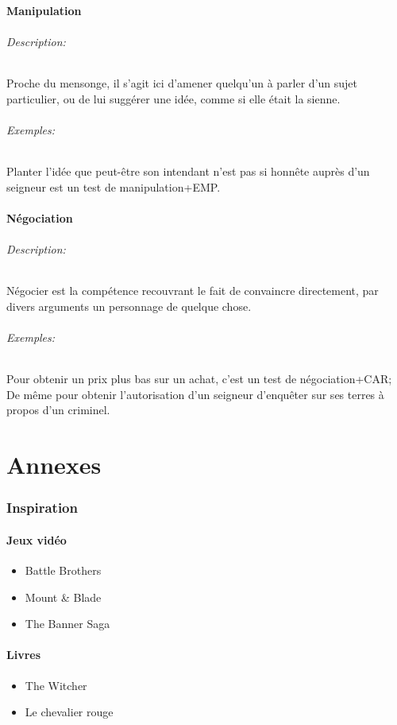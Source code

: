 \documentclass[10pt,a4paper,twocolumn]{book}
\begin{document}
\subsection{Manipulation}
\paragraph{Description:}Proche du mensonge, il s'agit ici d'amener quelqu'un à parler d'un sujet particulier, ou de lui suggérer une idée, comme si elle était la sienne.
\paragraph{Exemples:}Planter l'idée que peut-être son intendant n'est pas si honnête auprès d'un seigneur est un test de manipulation+EMP.
\subsection{Négociation}
\paragraph{Description:}Négocier est la compétence recouvrant le fait de convaincre directement, par divers arguments un personnage de quelque chose.
\paragraph{Exemples:}Pour obtenir un prix plus bas sur un achat, c'est un test de négociation+CAR; De même pour obtenir l'autorisation d'un seigneur d'enquêter sur ses terres à propos d'un criminel.




\part*{Annexes}
\section*{Inspiration}
\subsection*{Jeux vidéo}
\begin{itemize}
\item Battle Brothers
\item Mount \& Blade
\item The Banner Saga
\end{itemize}
\subsection*{Livres}
\begin{itemize}
\item The Witcher
\item Le chevalier rouge
\end{itemize}
\end{document}
